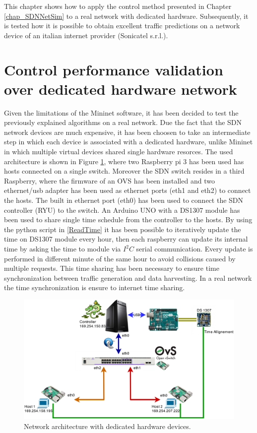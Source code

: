This chapter shows how to apply the control method presented in Chapter \ref{chap_SDNNetSim} to a real network with dedicated hardware. Subsequently, it is tested how it is possible to obtain excellent traffic predictions on a network device of an italian internet provider (Sonicatel s.r.l.).
\section{Control performance validation over dedicated hardware network}
Given the limitations of the Mininet software, it has been decided to test the previously explained algorithms on a real network. Due the fact that the SDN network devices are much expensive, it has been choosen to take an intermediate step in which each device is associated with a dedicated hardware, unlike Mininet in which multiple virtual devices shared single hardware resorces. The used architecture is shown in Figure \ref{fig:{Real_NET}}, where two Raspberry pi 3 \cite{rasp} has been used has hosts connected on a single switch. Moreover the SDN switch resides in a third Raspberry, where the firmware of an OVS has been installed and two ethernet/usb adapter has been used as ethernet ports (eth1 and eth2) to connect the hosts. The built in ethernet port (eth0) has been used to connect the SDN controller (RYU) to the switch. An Arduino UNO with a DS1307 module has been used to share single time schedule from the controller to the hosts. By using the python script in \ref{ReadTime}  it has been possible to iteratively update the time on DS1307 module every hour, then each raspberry can update its internal time by asking the time to module via $I^{2}C$ serial communication. Every update is performed in different minute of the same hour to avoid collisions caused by multiple requests. This time sharing has been necessary to ensure time synchronization between traffic generation and data harvesting. In a real network the time synchronization is ensure to internet time sharing.
\begin{figure}[tb!]
	\centering
	\includegraphics[width=13cm]{figure/Real_NET.png}
	\caption{Network architecture with dedicated hardware devices.}
	\label{fig:{Real_NET}}
\end{figure}
